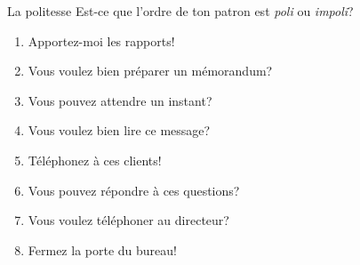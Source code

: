 \begin{frame}{La politesse}
  Est-ce que l'ordre de ton patron  est \emph{poli} ou \emph{impoli}? \\
  \begin{center}
    \begin{enumerate}
      \item Apportez-moi les rapports! \underline{}
      \item Vous voulez bien préparer un mémorandum? \underline{}
      \item Vous pouvez attendre un instant? \underline{}
      \item Vous voulez bien lire ce message? \underline{}
      \item Téléphonez à ces clients! \underline{}
      \item Vous pouvez répondre à ces questions? \underline{}
      \item Vous voulez téléphoner au directeur? \underline{}
      \item Fermez la porte du bureau! \underline{}
    \end{enumerate}
  \end{center}
\end{frame}